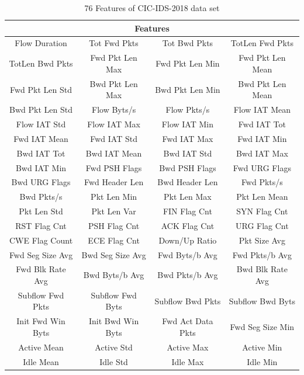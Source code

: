 \documentclass[journal]{IEEEtran}
\begin{document}
\begin{table}[!htpb]
    \caption{76 Features of CIC-IDS-2018 data set}
    \label{tab:features}
    \centering
    \begin{tabular}{cccc}
    \toprule
    \multicolumn{4}{c}{Features} \\
    \midrule
    Flow Duration &      Tot Fwd Pkts &        Tot Bwd Pkts &        TotLen Fwd Pkts \\
    TotLen Bwd Pkts &    Fwd Pkt Len Max &     Fwd Pkt Len Min &     Fwd Pkt Len Mean \\
    Fwd Pkt Len Std &    Bwd Pkt Len Max &     Bwd Pkt Len Min &     Bwd Pkt Len Mean \\
    Bwd Pkt Len Std &    Flow Byts/s &         Flow Pkts/s &         Flow IAT Mean \\
    Flow IAT Std &       Flow IAT Max &        Flow IAT Min &        Fwd IAT Tot \\
    Fwd IAT Mean &       Fwd IAT Std &         Fwd IAT Max &         Fwd IAT Min \\
    Bwd IAT Tot &        Bwd IAT Mean &        Bwd IAT Std &         Bwd IAT Max \\
    Bwd IAT Min &        Fwd PSH Flags &       Bwd PSH Flags &       Fwd URG Flags \\
    Bwd URG Flags &      Fwd Header Len &      Bwd Header Len &      Fwd Pkts/s \\
    Bwd Pkts/s &         Pkt Len Min &         Pkt Len Max &         Pkt Len Mean \\
    Pkt Len Std &        Pkt Len Var &         FIN Flag Cnt &        SYN Flag Cnt \\
    RST Flag Cnt &       PSH Flag Cnt &        ACK Flag Cnt &        URG Flag Cnt \\
    CWE Flag Count &     ECE Flag Cnt &        Down/Up Ratio &       Pkt Size Avg \\
    Fwd Seg Size Avg &   Bwd Seg Size Avg &    Fwd Byts/b Avg &      Fwd Pkts/b Avg \\
    Fwd Blk Rate Avg &   Bwd Byts/b Avg &      Bwd Pkts/b Avg &      Bwd Blk Rate Avg \\
    Subflow Fwd Pkts &   Subflow Fwd Byts &    Subflow Bwd Pkts &    Subflow Bwd Byts \\
    Init Fwd Win Byts &  Init Bwd Win Byts &   Fwd Act Data Pkts &   Fwd Seg Size Min \\
    Active Mean &        Active Std &          Active Max &          Active Min \\
    Idle Mean &          Idle Std &            Idle Max &            Idle Min \\
    \bottomrule
    \end{tabular}

\end{table}
\end{document}
